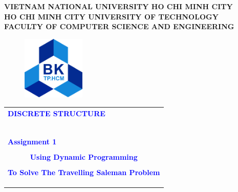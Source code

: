 \documentclass[a4paper]{article}
\begin{document}
\begin{titlepage}
\begin{center}
\textbf{\Large VIETNAM NATIONAL UNIVERSITY HO CHI MINH CITY} \\

\vspace{7pt}
\textbf{\Large HO CHI MINH CITY UNIVERSITY OF TECHNOLOGY} \\

\vspace{7pt}
\textbf{\Large FACULTY OF COMPUTER SCIENCE AND ENGINEERING}
\end{center}

\vspace{1cm}

\begin{figure}[h!]
\begin{center}
\includegraphics[width=3cm]{Images/hcmut.png}
\end{center}
\end{figure}

\vspace{1cm}


\begin{center}
\begin{tabular}{ccc}
	\multicolumn{3}{l}{\textbf{{\Large \textcolor{blue}{DISCRETE STRUCTURE}}}}\\
	~~\\
	\arrayrulecolor{blue}\hline
	\\
	\multicolumn{3}{l}{\textbf{{\Large \textcolor{blue}{Assignment 1} }}}\\
	\\
	
	\multicolumn{3}{c}{\textbf{{\huge \textcolor{blue}{Using Dynamic Programming}}}}\\
	\\
    
    \multicolumn{3}{c}{\textbf{{\huge \textcolor{blue}{To Solve The Travelling Saleman Problem}}}}\\
	\\
	\arrayrulecolor{blue}\hline \\ \\


\end{tabular}
\end{center}
\end{titlepage}
\end{document}
